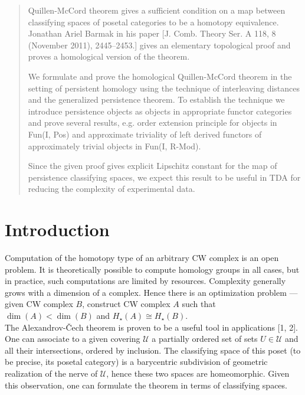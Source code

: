 \documentclass[english,12pt]{article}
\numberwithin{equation}{section}
\theoremstyle{definition}
\theoremstyle{remark}
\begin{document}
\begin{abstract}
Quillen-McCord theorem gives a sufficient condition on a map between classifying spaces of posetal categories to be a homotopy equivalence. Jonathan Ariel Barmak in his paper [J. Comb. Theory Ser. A 118, 8 (November 2011), 2445–2453.] gives an elementary topological proof and proves a homological version of the theorem.

We formulate and prove the homological Quillen-McCord theorem in the setting of persistent homology using the technique of interleaving distances and the generalized persistence theorem. To establish the technique we introduce persistence objects as objects in appropriate functor categories and prove several results, e.g. order extension principle for objects in Fun(I, Pos) and approximate triviality of left derived functors of approximately trivial objects in Fun(I, R-Mod).

Since the given proof gives explicit Lipschitz constant for the map of persistence classifying spaces, we expect this result to be useful in TDA for reducing the complexity of experimental data.
\end{abstract}


\section{Introduction}

Computation of the homotopy type of an arbitrary CW complex is an open problem. It is theoretically possible to compute homology groups in all cases, but in practice, such computations are limited by resources. Complexity generally grows with a dimension of a complex. Hence there is an optimization problem --- given CW complex $B$, construct CW complex $A$ such that $\operatorname{dim}(A) < \operatorname{dim}(B)$ and $H_{\star}(A) \cong H_{\star}(B)$.\\

The Alexandrov-\v{C}ech theorem is proven to be a useful tool in applications [1, 2]. One can associate to a given covering $\mathcal{U}$ a partially ordered set of sets $U \in \mathcal{U}$ and all their intersections, ordered by inclusion. The classifying space of this poset (to be precise, its posetal category) is a barycentric subdivision of geometric realization of the nerve of $\mathcal{U}$, hence these two spaces are homeomorphic. Given this observation, one can formulate the theorem in terms of classifying spaces.\\
\end{document}
